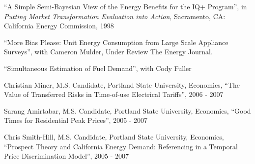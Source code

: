 \documentclass[Computer Science]{vita}
\begin{document}
\begin{vita}
\begin{Selected Publications}
\begin{Unrefereed Public Reports}
	
    \item ``A Simple Semi-Bayesian View of the Energy Benefits for the
      IQ+ Program'', in \emph{Putting Market Transformation Evaluation
        into Action}, Sacramento, CA: California Energy Commission,
      1998
	
    \end{Unrefereed Public Reports}

\begin{Working Papers}

\item ``More Bias Please: Unit Energy Consumption from Large Scale Appliance Surveys'', with Cameron Mulder, Under Review The Energy Journal.

\item ``Simultaneous Estimation of Fuel Demand'', with Cody Fuller
 
\end{Working Papers}

  \end{Selected Publications}


  \begin{Instructional Activities}






    \begin{M.S. Project Adviser}

    \item Christian Miner, M.S. Candidate, Portland State University,
      Economics, ``The Value of Transferred Risks in Time-of-use
      Electrical Tariffs'', 2006 - 2007

    \item Sarang Amirtabar, M.S. Candidate, Portland State University,
      Economics, ``Good Times for Residential Peak Prices'', 2005 -
      2007

    \item Chris Smith-Hill, M.S. Candidate, Portland State University,
      Economics, ``Prospect Theory and California Energy Demand:
      Referencing in a Temporal Price Discrimination Model'', 2005 -
      2007
    \end{M.S. Project Adviser}


\end{Instructional Activities}
\end{vita}
\end{document}
